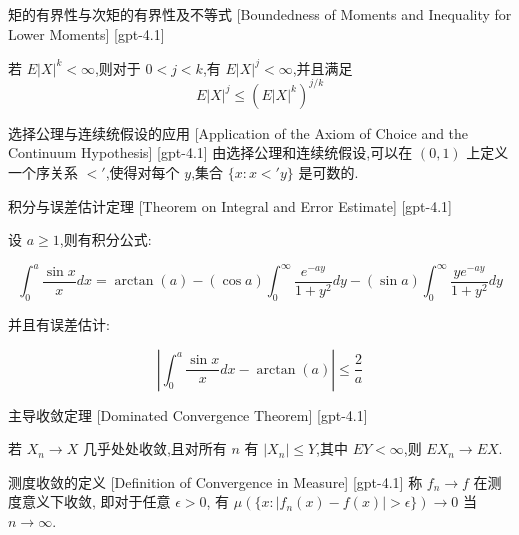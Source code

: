 \documentclass[UTF8]{ctexart}
\begin{document}
    
    
    \begin{thm}
        {矩的有界性与次矩的有界性及不等式}
        [Boundedness of Moments and Inequality for Lower Moments]
        [gpt-4.1]
        
若 $E |X|^{k} < \infty$,则对于 $0 < j < k$,有 $E |X|^{j} < \infty$,并且满足
\[
E |X|^{j} \leq (E |X|^{k})^{j/k}
\]

    \end{thm}
    
    
    
    \begin{axm}
        {选择公理与连续统假设的应用}
        [Application of the Axiom of Choice and the Continuum Hypothesis]
        [gpt-4.1]
        由选择公理和连续统假设,可以在 $(0,1)$ 上定义一个序关系 $<'$,使得对每个 $y$,集合 $\{ x : x <' y \}$ 是可数的.
    \end{axm}
    
    
    
    \begin{thm}
        {积分与误差估计定理}
        [Theorem on Integral and Error Estimate]
        [gpt-4.1]
        
设 $a \geq 1$,则有积分公式:

\[
\int_0^a \frac{\sin x}{x} dx = \arctan(a) - (\cos a) \int_0^{\infty} \frac{e^{-a y}}{1 + y^2} dy - (\sin a) \int_0^{\infty} \frac{y e^{-a y}}{1 + y^2} dy
\]

并且有误差估计:

\[
\left| \int_0^a \frac{\sin x}{x} dx - \arctan(a) \right| \leq \frac{2}{a}
\]

    \end{thm}
    
    
    
    \begin{thm}
        {主导收敛定理}
        [Dominated Convergence Theorem]
        [gpt-4.1]
        
若 $X_n \to X$ 几乎处处收敛,且对所有 $n$ 有 $|X_n| \leq Y$,其中 $E Y < \infty$,则 $E X_n \to E X$.

    \end{thm}
    
    
    
    \begin{dfn}
        {测度收敛的定义}
        [Definition of Convergence in Measure]
        [gpt-4.1]
        称 $f_{n} \to f$ 在测度意义下收敛, 即对于任意 $\epsilon > 0$, 有 $\mu(\{ x : |f_{n}(x) - f(x)| > \epsilon \}) \to 0$ 当 $n \to \infty$.
    \end{dfn}
    
\end{document}

